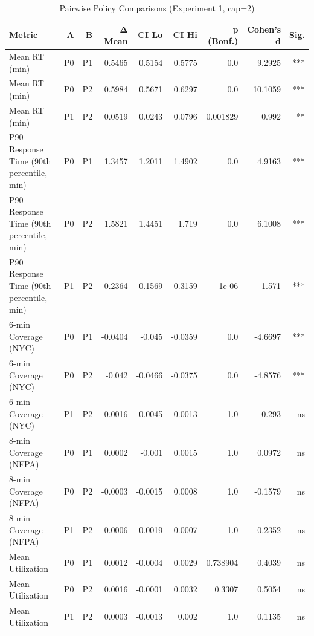 \begin{table}[htbp]
\centering
\caption{Pairwise Policy Comparisons (Experiment 1, cap=2)}
\label{tab:pairwise}
\begin{tabular}{lrrrrrrrr}
\toprule
Metric & A & B & Δ Mean & CI Lo & CI Hi & p (Bonf.) & Cohen's d & Sig. \\
\midrule
Mean RT (min) & P0 & P1 & 0.5465 & 0.5154 & 0.5775 & 0.0 & 9.2925 & *** \\
Mean RT (min) & P0 & P2 & 0.5984 & 0.5671 & 0.6297 & 0.0 & 10.1059 & *** \\
Mean RT (min) & P1 & P2 & 0.0519 & 0.0243 & 0.0796 & 0.001829 & 0.992 & ** \\
P90 Response Time (90th percentile, min) & P0 & P1 & 1.3457 & 1.2011 & 1.4902 & 0.0 & 4.9163 & *** \\
P90 Response Time (90th percentile, min) & P0 & P2 & 1.5821 & 1.4451 & 1.719 & 0.0 & 6.1008 & *** \\
P90 Response Time (90th percentile, min) & P1 & P2 & 0.2364 & 0.1569 & 0.3159 & 1e-06 & 1.571 & *** \\
6-min Coverage (NYC) & P0 & P1 & -0.0404 & -0.045 & -0.0359 & 0.0 & -4.6697 & *** \\
6-min Coverage (NYC) & P0 & P2 & -0.042 & -0.0466 & -0.0375 & 0.0 & -4.8576 & *** \\
6-min Coverage (NYC) & P1 & P2 & -0.0016 & -0.0045 & 0.0013 & 1.0 & -0.293 & ns \\
8-min Coverage (NFPA) & P0 & P1 & 0.0002 & -0.001 & 0.0015 & 1.0 & 0.0972 & ns \\
8-min Coverage (NFPA) & P0 & P2 & -0.0003 & -0.0015 & 0.0008 & 1.0 & -0.1579 & ns \\
8-min Coverage (NFPA) & P1 & P2 & -0.0006 & -0.0019 & 0.0007 & 1.0 & -0.2352 & ns \\
Mean Utilization & P0 & P1 & 0.0012 & -0.0004 & 0.0029 & 0.738904 & 0.4039 & ns \\
Mean Utilization & P0 & P2 & 0.0016 & -0.0001 & 0.0032 & 0.3307 & 0.5054 & ns \\
Mean Utilization & P1 & P2 & 0.0003 & -0.0013 & 0.002 & 1.0 & 0.1135 & ns \\
\bottomrule
\end{tabular}
\end{table}
